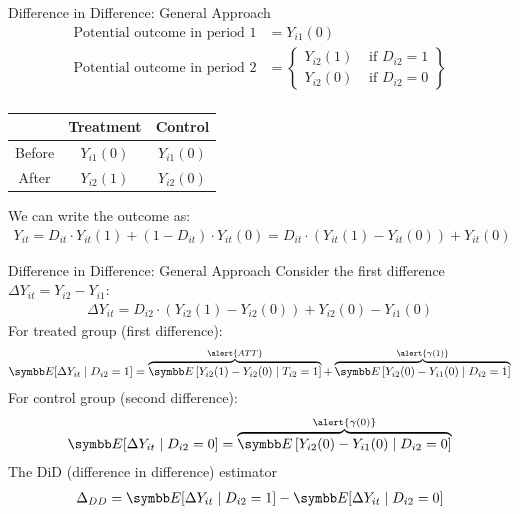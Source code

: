 \documentclass[aspectratio=169,11pt]{beamer}
\begin{document}
\begin{frame}{Difference in Difference: General Approach}
\begin{align*}
\text{Potential outcome in period } 1&=Y_{i 1}(0)\\
\text{Potential outcome in period } 2&=\left\{ \begin{array}{ll}
Y_{i 2}(1) & \text { if } D_{i 2}=1 \\ 
Y_{i 2}(0) & \text { if } D_{i 2}=0
\end{array}\right\}\\
\end{align*}
\begin{center}
\begin{tabular}{|c|c|c|}
\hline & Treatment & Control \\
\hline Before & $Y_{i 1}(0)$ & $Y_{i 1}(0)$ \\
After & $Y_{i 2}(1)$ & $Y_{i 2}(0)$ \\
\hline
\end{tabular}
\end{center}
We can write the outcome as:
\begin{align*}
Y_{i t}=D_{i t} \cdot Y_{i t}(1)+\left(1-D_{i t}\right) \cdot Y_{i t}(0)=D_{i t} \cdot\left(Y_{i t}(1)-Y_{i t}(0) \right)+Y_{i t}(0)
\end{align*}
\end{frame}

\begin{frame}{Difference in Difference: General Approach}
\small
Consider the first difference $\Delta Y_{it} = Y_{i2} - Y_{i1}$:
\begin{align*}
\Delta Y_{it}  = D_{i2} \cdot \left(Y_{i2}(1) - Y_{i2}(0) \right) +  Y_{i2}(0) - Y_{i1}(0)
\end{align*}
For treated group (first difference):
\begin{align*}
\E[\Delta Y_{it} \mid D_{i2}=1]  = \overbrace{\E\left[Y_{i2}(1) - Y_{i2}(0) \mid T_{i2}=1 \right]}^{\alert{ATT}} +  \overbrace{\E\left[Y_{i2}(0) - Y_{i1}(0) \mid D_{i2}=1 \right]}^{\alert{\gamma(1)}}
\end{align*}
For control group (second difference):
\begin{align*}
\E[\Delta Y_{it} \mid D_{i2}=0]  = \overbrace{\E\left[Y_{i2}(0) - Y_{i1}(0) \mid D_{i2}=0 \right]}^{\alert{\gamma(0)}}
\end{align*}
The DiD (difference in difference) estimator
\begin{align*}
\Delta_{DD} = \E[\Delta Y_{it} \mid D_{i2}=1]  - \E[\Delta Y_{it} \mid D_{i2}=0]  
\end{align*}
\end{frame}
\end{document}
